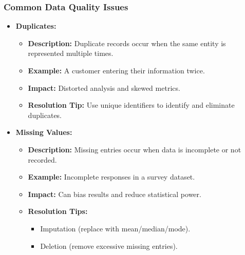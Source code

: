 \documentclass[aspectratio=169]{beamer}
\begin{document}
\begin{frame}[fragile]
    \frametitle{Common Data Quality Issues}
    \begin{itemize}
        \item \textbf{Duplicates:}
        \begin{itemize}
            \item \textbf{Description:} Duplicate records occur when the same entity is represented multiple times.
            \item \textbf{Example:} A customer entering their information twice.
            \item \textbf{Impact:} Distorted analysis and skewed metrics.
            \item \textbf{Resolution Tip:} Use unique identifiers to identify and eliminate duplicates.
        \end{itemize}
        
        \item \textbf{Missing Values:}
        \begin{itemize}
            \item \textbf{Description:} Missing entries occur when data is incomplete or not recorded.
            \item \textbf{Example:} Incomplete responses in a survey dataset.
            \item \textbf{Impact:} Can bias results and reduce statistical power.
            \item \textbf{Resolution Tips:}
            \begin{itemize}
                \item Imputation (replace with mean/median/mode).
                \item Deletion (remove excessive missing entries).
            \end{itemize}
        \end{itemize}
    \end{itemize}
\end{frame}
\end{document}
